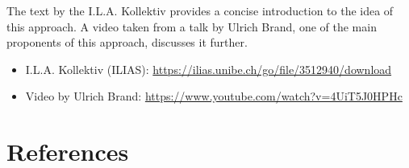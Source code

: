\documentclass[
  british,
  a4paper,
  DIV=11,
  numbers=noendperiod,
  oneside,
  openany]{scrreprt}
\providecommand{\tightlist}{%
  \setlength{\itemsep}{0pt}\setlength{\parskip}{0pt}}
\begin{document}
The text by the I.L.A. Kollektiv provides a concise introduction to the
idea of this approach. A video taken from a talk by Ulrich Brand, one of
the main proponents of this approach, discusses it further.

\begin{itemize}
\tightlist
\item
  I.L.A. Kollektiv (ILIAS):
  \url{https://ilias.unibe.ch/go/file/3512940/download}
\item
  Video by Ulrich Brand:
  \url{https://www.youtube.com/watch?v=4UiT5J0HPHc}
\end{itemize}


\chapter*{References}\label{references}

\end{document}
